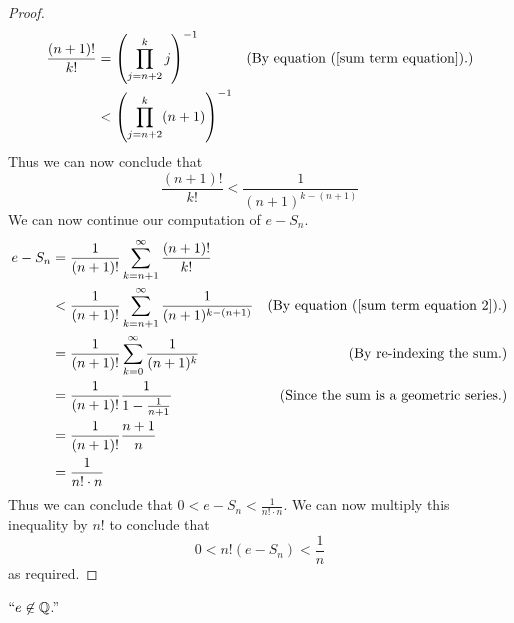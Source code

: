 \begin{proof}
\begin{align*}
                \frac{(n + 1)!}{k!} &= \left(\prod_{j = n + 2}^{k} j \right)^{-1}
                                    & (\mbox{By equation (\ref{sum term equation}).}) \\
                                    &< \left(\prod_{j = n + 2}^{k} (n + 1) \right)^{-1}\\
            \end{align*}
            Thus we can now conclude that
            \begin{equation}
                \label{sum term equation 2}
                \frac{(n + 1)!}{k!} < \frac{1}{(n + 1)^{k - (n + 1)}}
            \end{equation}
            We can now continue our computation of $e - S_n$.
            \begin{align*}
                e - S_n &= \frac{1}{(n + 1)!} \sum_{k = n + 1}^{\infty} \frac{(n + 1)!}{k!} \\
                        &< \frac{1}{(n + 1)!} \sum_{k = n + 1}^{\infty} \frac{1}{(n + 1)^{k - (n + 1)}}
                        & (\mbox{By equation $(\ref{sum term equation 2})$.}) \\
                        &= \frac{1}{(n + 1)!} \sum_{k = 0}^{\infty} \frac{1}{(n + 1)^{k}}
                        & (\mbox{By re-indexing the sum.}) \\
                        &= \frac{1}{(n + 1)!} \frac{1}{1 - \frac{1}{n + 1}}
                        & (\mbox{Since the sum is a geometric series.}) \\
                        &= \frac{1}{(n + 1)!} \frac{n + 1}{n} \\
                        &= \frac{1}{n! \cdot n}
            \end{align*}
            Thus we can conclude that $0 < e - S_n < \frac{1}{n! \cdot n}$. We can now multiply
            this inequality by $n!$ to conclude that
            \begin{equation}
                0 < n! (e - S_n) < \frac{1}{n}
            \end{equation}
            as required. \QED
        \end{proof}
        \begin{theorem}
            $``e \not\in \mathbb{Q}$.''
        \end{theorem}
